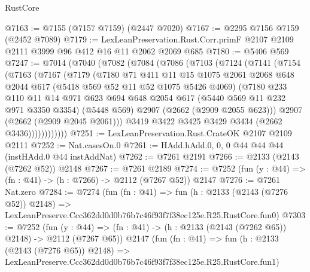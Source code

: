 \begin{lexlean}{RustCore}
\begin{coremodule}
@7163 := @7155 (@7157 @7159) (@2447 @7020)
@7167 := @2295 @7156 @7159 (@2452 @7089)
@7179 := LexLeanPreservation.Rust.Corr.primF
    @2107
    @2109
    @2111
    @3999
    @96
    @412
    @16
    @11
    @2062
    @2069
    @685
@7180 := @5406 @569
@7247 := @7014
    (@7040
      (@7082
        (@7084
          (@7086
            (@7103
              (@7124
                (@7141
                  (@7154
                    (@7163
                      (@7167
                        (@7179
                          (@7180
                            @71
                            @411
                            @11
                            @15
                            @1075
                            @2061
                            @2068
                            @648
                            @2044
                            @617
                            (@5418 @569 @52 @11 @52 @1075 @5426 @4069)
                            (@7180
                              @233
                              @110
                              @11
                              @14
                              @971
                              @623
                              @694
                              @648
                              @2054
                              @617
                              (@5440 @569 @11 @232 @971 @3350 @3354)
                              (@5448 @569)
                              @2907
                              (@2662 (@2909 @2055 @623)))
                            @2907
                            (@2662 (@2909 @2045 @2061)))
                          @3419
                          @3422
                          @3425
                          @3429
                          @3434
                          (@2662 @3436))))))))))))
@7251 := LexLeanPreservation.Rust.CrateOK @2107 @2109 @2111
@7252 := Nat.casesOn.{0}
@7261 := HAdd.hAdd.{0, 0, 0} @44 @44 @44 (instHAdd.{0} @44 instAddNat)
@7262 := @7261 @2191
@7266 := @2133 (@2143 (@7262 @52)) @2148
@7267 := @7261 @2189
@7274 := @7252 (fun (y : @44) => (fn : @41) -> (h : @7266) -> @2112 (@7267 @52)) @2147
@7276 := @7261 Nat.zero
@7284 := @7274
    (fun (fn : @41) =>
    fun (h : @2133 (@2143 (@7276 @52)) @2148) =>
    LexLeanPreserve.Ccc362dd0d0b76b7c46f93f7f38ec125e.R25.RustCore.fun0)
@7303 := @7252
    (fun (y : @44) => (fn : @41) -> (h : @2133 (@2143 (@7262 @65)) @2148) -> @2112 (@7267 @65))
    @2147
    (fun (fn : @41) =>
    fun (h : @2133 (@2143 (@7276 @65)) @2148) =>
    LexLeanPreserve.Ccc362dd0d0b76b7c46f93f7f38ec125e.R25.RustCore.fun1)

\end{coremodule}
\end{lexlean}
